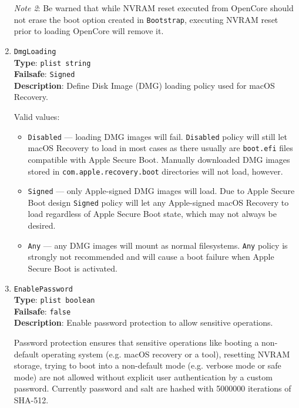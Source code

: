 \documentclass[]{article}
\makeatletter
\providecommand{\tightlist}{%
  \setlength{\itemsep}{0pt}\setlength{\parskip}{0pt}}
\renewcommand{\label}[1]{%
\zref@wrapper@immediate{\oldlabel{#1}}}  %
\makeatother
\begin{document}
\begin{enumerate}
  \emph{Note 2}: Be warned that while NVRAM reset executed from OpenCore should not erase the boot
  option created in \texttt{Bootstrap}, executing NVRAM reset prior to loading OpenCore will remove it.

\item \label{securedmgloading}
  \texttt{DmgLoading}\\
  \textbf{Type}: \texttt{plist\ string}\\
  \textbf{Failsafe}: \texttt{Signed}\\
  \textbf{Description}: Define Disk Image (DMG) loading policy used for macOS Recovery.

  Valid values:

  \begin{itemize}
  \tightlist
  \item \texttt{Disabled} --- loading DMG images will fail. \texttt{Disabled}
    policy will still let macOS Recovery to load in most cases as there
    usually are \texttt{boot.efi} files compatible with Apple Secure Boot.
    Manually downloaded DMG images stored in \texttt{com.apple.recovery.boot}
    directories will not load, however.
  \item \texttt{Signed} --- only Apple-signed DMG images will load. Due to
    Apple Secure Boot design \texttt{Signed} policy will let any Apple-signed
    macOS Recovery to load regardless of Apple Secure Boot state, which may
    not always be desired.
  \item \texttt{Any} --- any DMG images will mount as normal filesystems.
    \texttt{Any} policy is strongly not recommended and will cause a boot failure
    when Apple Secure Boot is activated.
  \end{itemize}

\item
  \texttt{EnablePassword}\\
  \textbf{Type}: \texttt{plist\ boolean}\\
  \textbf{Failsafe}: \texttt{false}\\
  \textbf{Description}: Enable password protection to allow sensitive operations.

  Password protection ensures that sensitive operations like booting a non-default
  operating system (e.g. macOS recovery or a tool), resetting NVRAM storage,
  trying to boot into a non-default mode (e.g. verbose mode or safe mode) are not
  allowed without explicit user authentication by a custom password. Currently
  password and salt are hashed with 5000000 iterations of SHA-512.


\end{enumerate}
\end{document}
